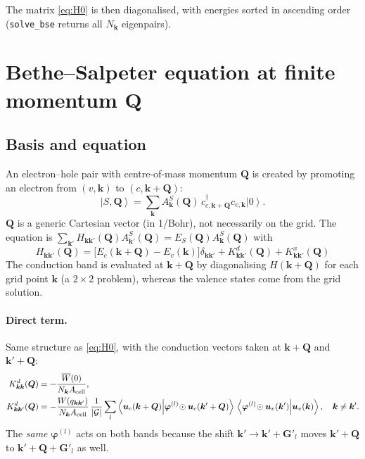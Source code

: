 \documentclass[11pt,a4paper]{article}
\newcommand{\kk}{\bm{k}}
\newcommand{\QQ}{\bm{Q}}
\newcommand{\ket}[1]{\left|#1\right\rangle}
\newcommand{\braket}[2]{\left\langle#1\middle|#2\right\rangle}
\newcommand{\code}[1]{\texttt{#1}}
\newcommand{\Acell}{A_{\rm cell}}
\newcommand{\Nk}{N_{\bm k}}
\newcommand{\Wbar}{\overline{W}(0)}
\begin{document}
The matrix \eqref{eq:H0} is then diagonalised, with energies sorted in ascending order (\code{solve\_bse} returns all $\Nk$ eigenpairs).

\section{Bethe--Salpeter equation at finite momentum \texorpdfstring{$\bm{Q}$}{Q}}
\label{sec:BSEQ}

\subsection{Basis and equation}
An electron--hole pair with centre-of-mass momentum $\QQ$ is created by promoting an electron from $(v,\kk)$ to $(c,\kk+\QQ)$:
\begin{equation}
\ket{S,\QQ}=\sum_{\kk}A^S_{\kk}(\QQ)\,c^\dagger_{c,\kk+\QQ}c_{v,\kk}\ket{0}.
\end{equation}
$\QQ$ is a generic Cartesian vector (in 1/Bohr), not necessarily on the grid. The equation is
$\sum_{\kk'}H_{\kk\kk'}(\QQ)A^S_{\kk'}(\QQ)=E_S(\QQ)A^S_{\kk}(\QQ)$ with
\begin{equation}
\boxed{\;
H_{\kk\kk'}(\QQ)=\big[E_c(\kk+\QQ)-E_v(\kk)\big]\delta_{\kk\kk'}+K^{d}_{\kk\kk'}(\QQ)+K^{x}_{\kk\kk'}(\QQ)\;}
\label{eq:HQ}
\end{equation}
The conduction band is evaluated at $\kk+\QQ$ by diagonalising $H(\kk+\QQ)$ for each grid point $\kk$ (a $2\times2$ problem), whereas the valence states come from the grid solution.

\paragraph{Direct term.} Same structure as \eqref{eq:H0}, with the conduction vectors taken at $\kk+\QQ$ and $\kk'+\QQ$:
\begin{align}
K^d_{\kk\kk}(\QQ)&=-\frac{\Wbar}{\Nk\Acell},\\
K^d_{\kk\kk'}(\QQ)&=-\frac{W(q_{\kk\kk'})}{\Nk\Acell}\,\frac{1}{|\mathcal G|}\sum_l
\braket{\bm u_c(\kk+\QQ)}{\bm\varphi^{(l)}\!\odot\bm u_c(\kk'+\QQ)}\,
\braket{\bm\varphi^{(l)}\!\odot\bm u_v(\kk')}{\bm u_v(\kk)},\quad \kk\ne\kk'.
\label{eq:Kd}
\end{align}
The \emph{same} $\bm\varphi^{(l)}$ acts on both bands because the shift $\kk'\to\kk'+\bm G'_l$ moves $\kk'+\QQ$ to $\kk'+\QQ+\bm G'_l$ as well.
\end{document}
